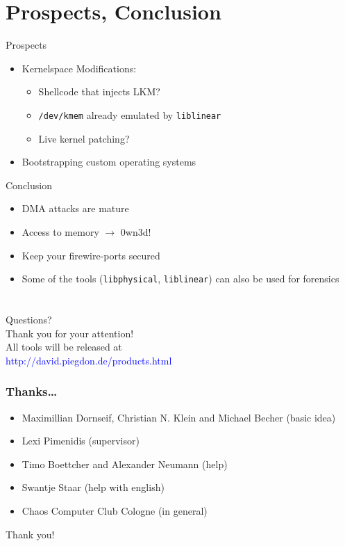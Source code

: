 \documentclass{beamer}
\newenvironment{itemizeframe}[1]
  {\begin{frame}{#1}\startitemizeframe}
  {\stopitemizeframe\end{frame}}
\newcommand\startitemizeframe{\begin{itemize}}
\newcommand\stopitemizeframe{\end{itemize}}
\begin{document}
\section{Prospects, Conclusion}

	\begin{itemizeframe}{Prospects}
		\item Kernelspace Modifications:
		\begin{itemize} 
			\item Shellcode that injects LKM?
			\item \texttt{/dev/kmem} already emulated by \texttt{liblinear}
			\item Live kernel patching?
		\end{itemize}
		\item Bootstrapping custom operating systems
	\end{itemizeframe}

	\begin{itemizeframe}{Conclusion}
		\item DMA attacks are mature
		\item Access to memory $\rightarrow$ 0wn3d!
		\item Keep your firewire-ports secured
		\item Some of the tools (\texttt{libphysical}, \texttt{liblinear}) can also be used for forensics
	\end{itemizeframe}

\AtBeginSection{ }

\section*{}

	\begin{frame}
		\begin{center}
			\Large
			Questions? \\[1.5ex]
			
			Thank you for your attention! \\[1.5ex]
			
			\small
			All tools will be released at \\
			\textcolor{blue}{http://david.piegdon.de/products.html}
		\end{center}
	\end{frame}

	\begin{frame}
		\frametitle{Thanks\ldots}
		\begin{itemize}
			\item Maximillian Dornseif, Christian N. Klein and Michael Becher (basic idea)
			\item Lexi Pimenidis (supervisor)
			\item Timo Boettcher and Alexander Neumann (help)
			\item Swantje Staar (help with english)
			\item Chaos Computer Club Cologne (in general)
		\end{itemize}
		Thank you!
	\end{frame}
\end{document}
